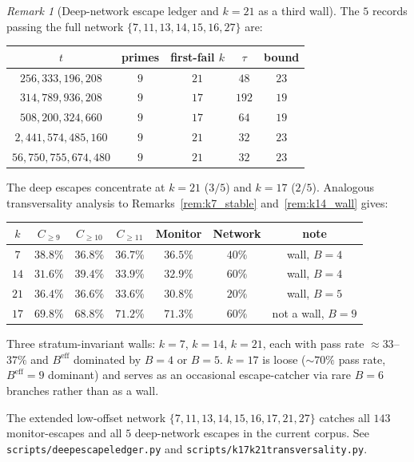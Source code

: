 \documentclass[11pt]{article}
\renewcommand{\_}{\origunderscore\allowbreak}
\theoremstyle{definition}
\theoremstyle{remark}
\newtheorem{remark}[theorem]{Remark}
\begin{document}
\begin{remark}[Deep-network escape ledger and $k=21$ as a third wall]\label{rem:deep_escape_ledger}
The $5$ records passing the full network
$\{7,11,13,14,15,16,27\}$ are:

\begin{center}
\begin{tabular}{c|c|c|c|c}
\hline
$t$ & primes & first-fail $k$ & $\tau$ & bound \\
\hline
$256{,}333{,}196{,}208$ & $9$ & $21$ & $48$ & $23$ \\
$314{,}789{,}936{,}208$ & $9$ & $17$ & $192$ & $19$ \\
$508{,}200{,}324{,}660$ & $9$ & $17$ & $64$ & $19$ \\
$2{,}441{,}574{,}485{,}160$ & $9$ & $21$ & $32$ & $23$ \\
$56{,}750{,}755{,}674{,}480$ & $9$ & $21$ & $32$ & $23$ \\
\hline
\end{tabular}
\end{center}

\noindent The deep escapes concentrate at $k=21$ ($3/5$) and $k=17$
($2/5$).  Analogous transversality analysis to
Remarks~\ref{rem:k7_stable} and~\ref{rem:k14_wall} gives:

\begin{center}
\begin{tabular}{c|cccccc}
\hline
$k$ & $C_{\ge 9}$ & $C_{\ge 10}$ & $C_{\ge 11}$ & Monitor & Network & note \\
\hline
$7$  & $38.8\%$ & $36.8\%$ & $36.7\%$ & $36.5\%$ & $40\%$ & wall, $B=4$ \\
$14$ & $31.6\%$ & $39.4\%$ & $33.9\%$ & $32.9\%$ & $60\%$ & wall, $B=4$ \\
$21$ & $36.4\%$ & $36.6\%$ & $33.6\%$ & $30.8\%$ & $20\%$ & wall, $B=5$ \\
$17$ & $69.8\%$ & $68.8\%$ & $71.2\%$ & $71.3\%$ & $60\%$ & not a wall, $B=9$ \\
\hline
\end{tabular}
\end{center}

\noindent Three stratum-invariant walls: $k=7$, $k=14$, $k=21$, each
with pass rate $\approx 33$--$37\%$ and $B^{\mathrm{eff}}$ dominated
by $B=4$ or $B=5$.  $k=17$ is loose ($\sim 70\%$ pass rate,
$B^{\mathrm{eff}}=9$ dominant) and serves as an occasional
escape-catcher via rare $B=6$ branches rather than as a wall.

The extended low-offset network
$\{7,11,13,14,15,16,17,21,27\}$ catches all $143$ monitor-escapes and
all $5$ deep-network escapes in the current corpus.  See
\texttt{scripts/deep\_escape\_ledger.py} and
\texttt{scripts/k17\_k21\_transversality.py}.
\end{remark}
\end{document}

